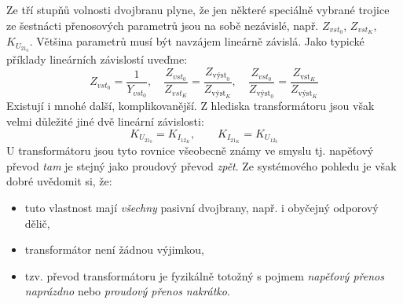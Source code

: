       Ze tří stupňů volnosti dvojbranu plyne, že jen některé speciálně vybrané trojice ze
      šestnácti přenosových parametrů jsou na sobě nezávislé, např. \(Z_{vst_0}\),  \(Z_{vst_K}\), 
      \(K_{U_{21_0}}\). Většina parametrů musí být navzájem lineárně závislá. Jako typické příklady 
      lineárních závislostí uveďme:
      \begin{equation*}          %
        Z_{vst_0} = \frac{1}{Y_{vst_0}}, \quad 
        \frac{Z_{vst_0}}{Z_{vst_K}}=\frac{Z_{\text{výst}_0}}{Z_{\text{výst}_K}}, \quad
        \frac{Z_{vst_0}}{Z_{\text{výst}_0}}=\frac{Z_{\text{vst}_K}}{Z_{\text{výst}_K}}
      \end{equation*}
      Existují i mnohé další, komplikovanější. Z hlediska transformátoru jsou však velmi důležité 
      jiné dvě lineární závislosti:
      \begin{equation}\label{ES:eq_topol15}
        K_{U_{21_0}} = K_{I_{12_K}}, \qquad 
        K_{I_{21_K}} = K_{U_{12_0}}
      \end{equation}
      U transformátoru jsou tyto rovnice všeobecně známy ve smyslu tj. napěťový převod \emph{tam} 
      je stejný jako proudový převod \emph{zpět}. Ze systémového pohledu je však dobré uvědomit si, 
      že:
      \begin{itemize}[noitemsep]
        \item tuto vlastnost mají \emph{všechny} pasivní dvojbrany, např. i obyčejný odporový dělič,
        \item transformátor není žádnou výjimkou,
        \item tzv. převod transformátoru je fyzikálně totožný s pojmem \emph{napěťový přenos 
              naprázdno} nebo \emph{proudový přenos nakrátko}.
      \end{itemize}
      
